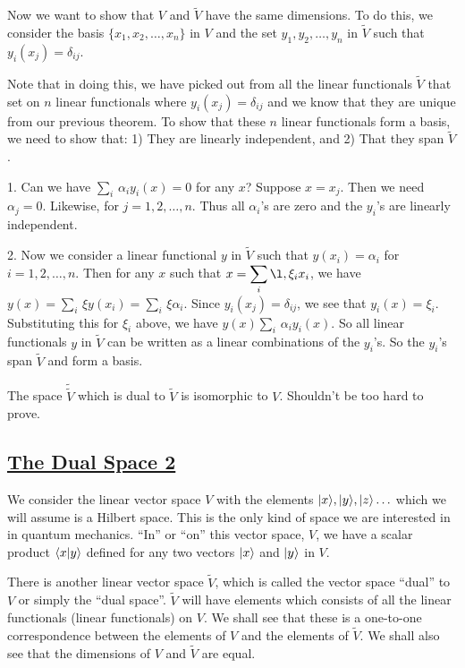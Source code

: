 Now we want to show that $V$ and $\tilde V$ have the same dimensions. 
To do this, we consider the basis $\{ x_1, x_2, \hdots, x_n \} $ in $V$ and the set 
$y_1, y_2, \hdots, y_n$ in  $\tilde V$ such that $y_i(x_j) = \delta_{ij}$. 

Note that in doing this, we have picked out from all the linear functionals $\tilde V$ that set on $n$ linear functionals where $y_i(x_j) = \delta_{ij}$ and we know that they are unique from our previous theorem. To show that these
$n$ linear functionals form a basis, we need to  show that: 1) They are linearly independent, and 2) That they span $\tilde V$.

1. Can we have $\displaystyle \sum_i\, \alpha_i y_i(x) = 0$ for any $x$? Suppose $x=x_j$. Then we need $\alpha_j = 0$. Likewise, for $j = 1,2,\hdots,n$. Thus all $\alpha_i$'s are zero and the $y_i$'s are linearly independent.

2. Now we consider a linear functional $y$ in $\tilde V$ such that $y(x_i) = \alpha_i$ for $i = 1,2,\hdots, n$. Then for any $x$ such that $\displaystyle x = \sum_i \l, \xi_i x_i$, we have 
$\displaystyle y(x) = \sum_i\, \xi y(x_i) = \sum_i \, \xi \alpha_i$. Since $y_i(x_j) = \delta_{ij}$, we see that $y_i(x) = \xi_i$. Substituting this for $\xi_i$ above, we have $\displaystyle y(x) \sum_i \, \alpha_i y_i(x)$. So all linear
functionals $y$ in $\tilde V$ can be written as a linear combinations of the $y_i$'s. So the $y_i$'s span $\tilde V$ and form a basis.

The space $\tilde{\tilde V}$ which is dual to $\tilde V$ is isomorphic to $V$. Shouldn't be too hard to prove. 

\subsection{\underline{The Dual Space 2}}
We consider the linear vector space $V$ with the elements $|x\rangle, |y\rangle, |z\rangle\hdots $ which we will assume is a Hilbert space. This is the only kind of space we are interested in in quantum mechanics. ``In'' or ``on'' this vector 
space, $V$, we have a scalar product $\langle x|y\rangle$ defined for any two vectors $|x\rangle$ and $|y\rangle$ in $V$. 

There is another linear vector space $\tilde V$, which is called the vector space ``dual'' to $V$ or simply the ``dual space''. $\tilde V$ will have elements which consists of all the linear functionals (linear functionals) on $V$. We shall
see that these is a one-to-one correspondence between the elements of $V$ and the elements of $\tilde V$. We shall also see that the dimensions of $V$ and $\tilde V$ are equal. 

